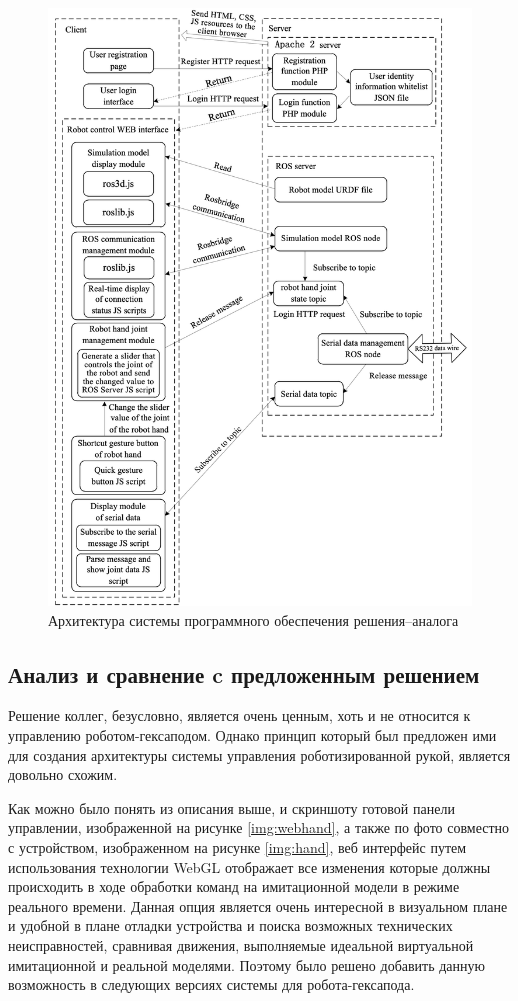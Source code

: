 \begin{figure}[h!]
	\centering
	\includegraphics[height = 0.9\textheight]{img/china2}
	\caption{Архитектура системы программного обеспечения решения–аналога}
	\label{img:china2}
\end{figure}

\subsection {Анализ и сравнение c предложенным решением}

Решение коллег, безусловно, является очень ценным, хоть и не относится к управлению роботом-гексаподом. Однако принцип который был предложен ими для создания архитектуры системы управления роботизированной рукой, является довольно схожим.

Как можно было понять из описания выше, и скриншоту готовой панели управлении, изображенной на рисунке \ref{img:webhand}, а также по фото совместно с устройством, изображенном на рисунке \ref{img:hand}, веб интерфейс путем использования технологии WebGL отображает все изменения которые должны происходить в ходе обработки команд на имитационной модели в режиме реального времени. Данная опция является очень интересной в визуальном плане и удобной в плане отладки устройства и поиска возможных технических неисправностей, сравнивая движения, выполняемые идеальной виртуальной имитационной и реальной моделями. Поэтому было решено добавить данную возможность в следующих версиях системы для робота-гексапода.

